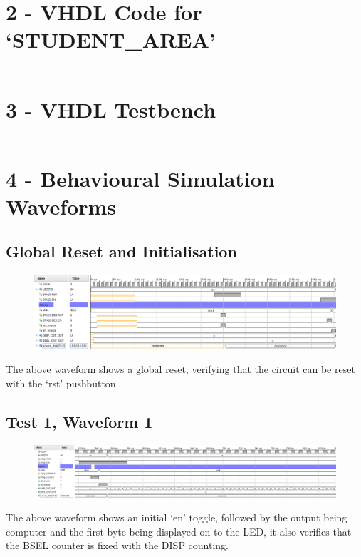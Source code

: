 \documentclass[11pt]{report}
\begin{document}
\section*{2 - VHDL Code for `STUDENT\_AREA'}
\inputminted{vhdl}{../../../DE_Project_T1/DE_Project_T1.srcs/sources_1/imports/DigEng_Proj_T1_model/STUDENT_AREA.vhd}

\section*{3 - VHDL Testbench}
\inputminted{vhdl}{../../../DE_Project_T1/DE_Project_T1.srcs/sim_1/imports/DigEng_Proj_T1_model/TOP_LEVEL_tb.vhd}

\section*{4 - Behavioural Simulation Waveforms}

\subsection*{Global Reset and Initialisation}
\begin{figure}[H]
    \includegraphics[width=\columnwidth]{Assets/reset.png}
\end{figure}
The above waveform shows a global reset, verifying that the circuit can be reset with the `rst' pushbutton.

\subsection*{Test 1, Waveform 1}
\begin{figure}[H]
    \includegraphics[width=\columnwidth]{Assets/test1_1.png}
\end{figure}
The above waveform shows an initial `en' toggle, followed by the output being computer and the first byte
being displayed on to the LED, it also verifies that the BSEL counter is fixed with the DISP counting.
\end{document}
